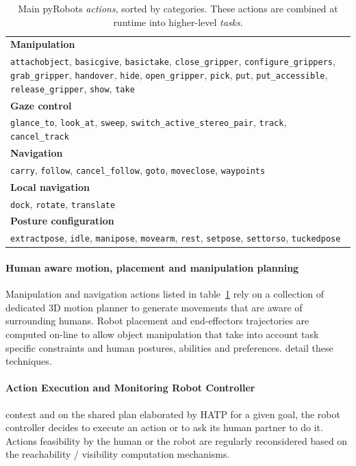 \documentclass[preprint,5p]{elsarticle}
\begin{document}
\begin{table}
\begin{center}
\begin{tabular}{p{8cm}}
\hline
    {\bf Manipulation} \\
     {\tt attachobject}, {\tt basicgive}, {\tt basictake}, {\tt close\_gripper}, {\tt configure\_grippers}, {\tt grab\_gripper}, {\tt handover}, {\tt hide}, {\tt open\_gripper}, {\tt pick}, {\tt put}, {\tt put\_accessible}, {\tt release\_gripper}, {\tt show}, {\tt take} \\
\hline
    {\bf Gaze control} \\
     {\tt glance\_to}, {\tt look\_at}, {\tt sweep}, {\tt switch\_active\_stereo\_pair}, {\tt track}, {\tt cancel\_track} \\
\hline
    {\bf Navigation} \\
     {\tt carry}, {\tt follow}, {\tt cancel\_follow}, {\tt goto}, {\tt moveclose}, {\tt waypoints} \\
\hline
    {\bf Local navigation} \\
     {\tt dock}, {\tt rotate}, {\tt translate} \\
\hline
    {\bf Posture configuration} \\
     {\tt extractpose}, {\tt idle}, {\tt manipose}, {\tt movearm}, {\tt rest}, {\tt setpose}, {\tt settorso}, {\tt tuckedpose} \\
\hline
\end{tabular}
\end{center}
\caption{Main {\sc pyRobots} \emph{actions}, sorted by categories. These
actions are combined at runtime into higher-level \emph{tasks}.}

\label{table|pyrobots_actions}
\end{table}

\paragraph{Human aware motion, placement and manipulation planning}
Manipulation and navigation actions listed in
table~\ref{table|pyrobots_actions} rely on a collection of dedicated 3D motion
planner to generate movements that are aware of surrounding humans. Robot
placement and end-effectors trajectories are computed on-line to allow object
manipulation that take into account task specific constraints and human
postures, abilities and preferences. \cite{Sisbot2008, Mainprice2011,
Pandey2010} detail these techniques.


\paragraph{Action Execution and Monitoring Robot Controller}
context and on the shared plan elaborated by HATP for a given goal,
the robot controller decides to execute an action or to ask its human
partner to do it.  Actions feasibility by the human or the robot are
regularly reconsidered based on the reachability / visibility
computation mechanisms.
\end{document}
